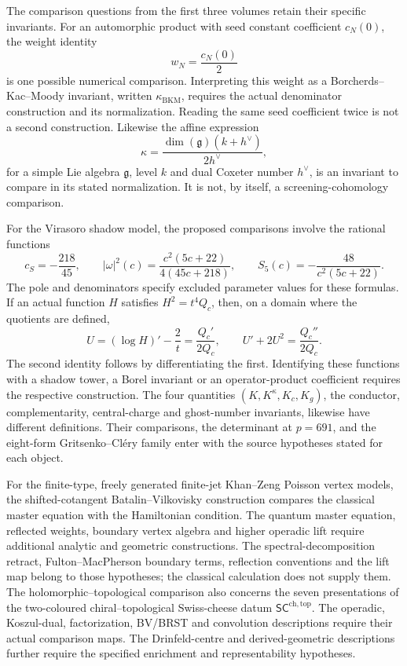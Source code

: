 The comparison questions from the first three volumes retain their
specific invariants. For an automorphic product with seed constant
coefficient \(c_N(0)\), the weight identity
\[
 w_N=\frac{c_N(0)}2
\]
is one possible numerical comparison. Interpreting this weight as a
Borcherds--Kac--Moody invariant, written \(\kappa_{\mathrm{BKM}}\),
requires the actual denominator construction and its normalization.
Reading the same seed coefficient twice is not a second construction.
Likewise the affine expression
\[
 \kappa=\frac{\dim(\mathfrak g)(k+h^\vee)}{2h^\vee},
\]
for a simple Lie algebra \(\mathfrak g\), level \(k\) and dual
Coxeter number \(h^\vee\), is an invariant to compare in its stated
normalization. It is not, by itself, a screening-cohomology comparison.

For the Virasoro shadow model, the proposed comparisons involve the
rational functions
\[
 c_S=-\frac{218}{45},\qquad
 |\omega|^2(c)=\frac{c^2(5c+22)}{4(45c+218)},\qquad
 S_5(c)=-\frac{48}{c^2(5c+22)}.
\]
The pole and denominators specify excluded parameter values for these
formulas. If an actual function \(H\) satisfies \(H^2=t^4Q_c\),
then, on a domain where the quotients are defined,
\[
 U=(\log H)'-\frac2t=\frac{Q_c'}{2Q_c},\qquad
 U'+2U^2=\frac{Q_c''}{2Q_c}.
\]
The second identity follows by differentiating the first. Identifying
these functions with a shadow tower, a Borel invariant or an
operator-product coefficient requires the respective construction.
The four quantities \((K,K^\kappa,K_c,K_g)\), the conductor,
complementarity, central-charge and ghost-number invariants, likewise
have different definitions. Their comparisons, the determinant at
\(p=691\), and the eight-form Gritsenko--Cl\'ery family enter with
the source hypotheses stated for each object.

For the finite-type, freely generated finite-jet Khan--Zeng Poisson
vertex models, the shifted-cotangent Batalin--Vilkovisky construction
compares the classical master equation with the Hamiltonian condition.
The quantum master equation,
reflected weights, boundary vertex algebra and higher operadic lift
require additional analytic and geometric constructions. The
spectral-decomposition retract, Fulton--MacPherson boundary terms,
reflection conventions and the lift map belong to those hypotheses;
the classical calculation does not supply them.
The holomorphic--topological comparison also concerns the seven
presentations of the two-coloured chiral--topological Swiss-cheese
datum \(\mathsf{SC}^{\mathrm{ch,top}}\). The operadic, Koszul-dual,
factorization, BV/BRST and convolution descriptions require their actual
comparison maps. The Drinfeld-centre and derived-geometric descriptions
further require the specified enrichment and representability hypotheses.

